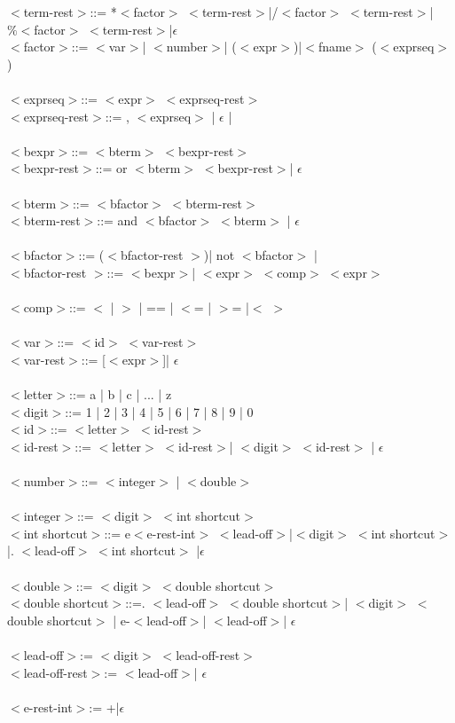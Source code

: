 \documentclass[fleqn]{article}
\begin{document}
$<$term-rest$>$::= *$<$factor$>$ $<$term-rest$>$|/$<$factor$>$ $<$term-rest$>$|$\%<$factor$>$ $<$term-rest$>$|$\epsilon$\\
$<$factor$>$::= $<$var$>$| $<$number$>$| ($<$expr$>$)|$<$fname$>$ ($<$exprseq$>$)\\
\\
$<$exprseq$>$::= $<$expr$>$ $<$exprseq-rest$>$\\
$<$exprseq-rest$>$::= , $<$exprseq$>$ | $\epsilon$ | \\
\\
$<$bexpr$>$::= $<$bterm$>$ $<$bexpr-rest$>$\\
$<$bexpr-rest$>$::=  or $<$bterm$>$ $<$bexpr-rest$>$| $\epsilon$\\
\\
$<$bterm$>$::= $<$bfactor$>$ $<$bterm-rest$>$ \\
$<$bterm-rest$>$::=  and $<$bfactor$>$ $<$bterm$>$ | $\epsilon$\\
\\
$<$bfactor$>$::= ($<$bfactor-rest $>$)| not $<$bfactor$>$ | \\
$<$bfactor-rest $>$::= $<$bexpr$>$| $<$expr$>$ $<$comp$>$ $<$expr$>$\\
\\
$<$comp$>$::= $<$ | $>$ | == | $<$= | $>$= |$<$ $>$\\
\\
$<$var$>$::= $<$id$>$ $<$var-rest$>$\\
$<$var-rest$>$::= [$<$expr$>$]| $\epsilon$\\
\\
$<$letter$>$::= a | b | c | ... | z \\
$<$digit$>$::= 1 | 2 | 3 | 4 | 5 | 6 | 7 | 8 | 9 | 0\\
$<$id$>$::= $<$letter$>$ $<$id-rest$>$\\
$<$id-rest$>$::= $<$letter$>$ $<$id-rest$>$|  $<$digit$>$ $<$id-rest$>$ | $\epsilon$\\
\\
$<$number$>$::= $<$integer$>$ | $<$double$>$ \\
\\
$<$integer$>$::= $<$digit$>$ $<$int shortcut$>$\\
$<$int shortcut$>$::= e$<$e-rest-int$>$ $<$lead-off$>$|$<$digit$>$ $<$int shortcut$>$|. $<$lead-off$>$ $<$int shortcut$>$ |$\epsilon$\\
\\
$<$double$>$::= $<$digit$>$ $<$double shortcut$>$\\
$<$double shortcut$>$::=. $<$lead-off$>$ $<$double shortcut$>$| $<$digit$>$ $<$double shortcut$>$ | e-$<$lead-off$>$| $<$lead-off$>$| $\epsilon$\\
\\
$<$lead-off$>$:= $<$digit$>$ $<$lead-off-rest$>$\\ 
$<$lead-off-rest$>$:=  $<$lead-off$>$| $\epsilon$\\ 
\\
$<$e-rest-int$>$:= +|$\epsilon$\\
\end{document}

